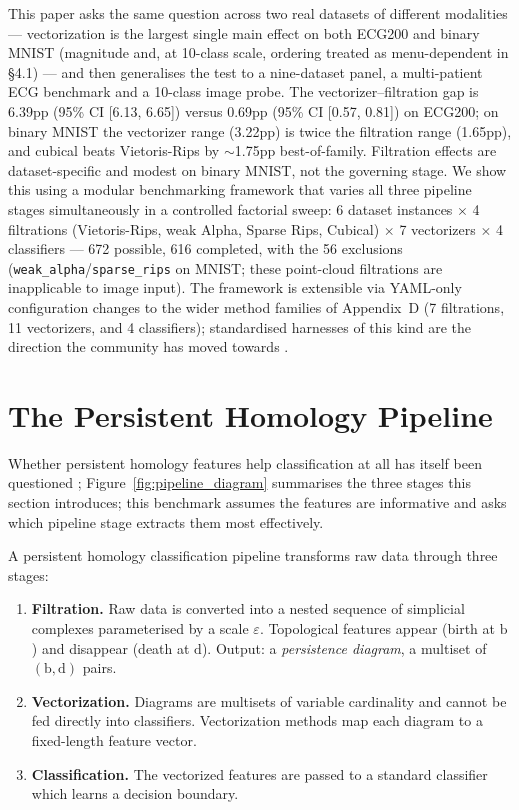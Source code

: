 \documentclass[12pt, a4paper]{report}
\newcommand{\birth}{\mathrm{b}}
\newcommand{\death}{\mathrm{d}}
\theoremstyle{definition}
\theoremstyle{plain}
\theoremstyle{remark}
\begin{document}
This paper asks the same question across two real datasets of
different modalities --- vectorization is the largest single main
effect on both ECG200 and binary MNIST (magnitude and, at 10-class
scale, ordering treated as menu-dependent in \S4.1) --- and then
generalises the test to a nine-dataset panel, a multi-patient ECG
benchmark and a 10-class image probe. The
vectorizer--filtration gap is 6.39pp (95\% CI [6.13, 6.65]) versus
0.69pp (95\% CI [0.57, 0.81]) on ECG200; on binary MNIST the
vectorizer range (3.22pp) is twice the filtration range (1.65pp), and
cubical beats Vietoris-Rips by $\sim$1.75pp best-of-family. Filtration
effects are dataset-specific and modest on binary MNIST, not the
governing stage. We show this using a modular benchmarking
framework that varies all three pipeline stages simultaneously in a
controlled factorial sweep: 6 dataset instances $\times$ 4 filtrations
(Vietoris-Rips, weak Alpha, Sparse Rips, Cubical) $\times$ 7
vectorizers $\times$ 4 classifiers --- 672 possible, 616 completed,
with the 56 exclusions (\texttt{weak\_alpha}/\texttt{sparse\_rips} on
MNIST; these point-cloud filtrations are inapplicable to image input). The framework is extensible via YAML-only configuration changes to
the wider method families of Appendix~D (7 filtrations, 11
vectorizers, and 4 classifiers);
standardised harnesses of this kind are the direction the community
has moved towards \cite{telyatnikov2024}.

\section{The Persistent Homology Pipeline}

Whether persistent homology features help classification at all has
itself been questioned \cite{turkes2022}; Figure~\ref{fig:pipeline_diagram} summarises the three stages this
section introduces; this benchmark assumes the
features are informative and asks which pipeline stage extracts them
most effectively.

A persistent homology classification pipeline transforms raw data
through three stages:

\begin{enumerate}
  \item \textbf{Filtration.} Raw data is converted into a nested
    sequence of simplicial complexes parameterised by a scale
    $\varepsilon$. Topological features appear (birth at $\birth$)
    and disappear (death at $\death$). Output: a \emph{persistence
    diagram}, a multiset of $(\birth, \death)$ pairs.
  \item \textbf{Vectorization.} Diagrams are multisets of variable
    cardinality and cannot be fed directly into classifiers.
    Vectorization methods map each diagram to a fixed-length feature
    vector.
  \item \textbf{Classification.} The vectorized features are passed
    to a standard classifier which learns a decision boundary.
\end{enumerate}
\end{document}
